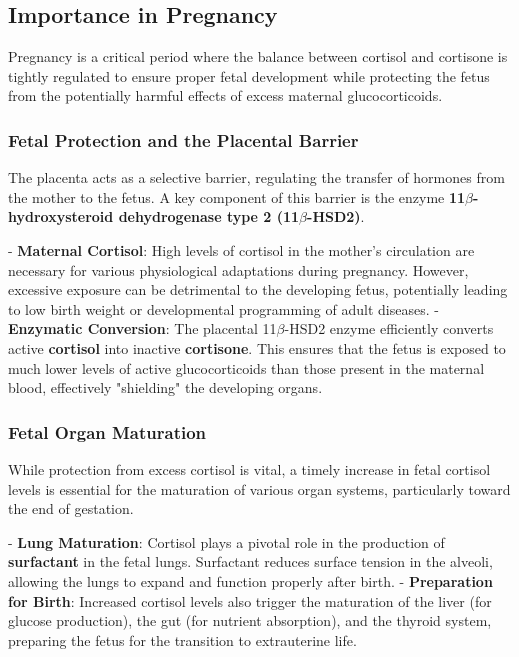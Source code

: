 \documentclass{article}
\begin{document}
\subsection{Importance in Pregnancy}

Pregnancy is a critical period where the balance between cortisol and cortisone is tightly regulated to ensure proper fetal development while protecting the fetus from the potentially harmful effects of excess maternal glucocorticoids.

\subsubsection{Fetal Protection and the Placental Barrier}

The placenta acts as a selective barrier, regulating the transfer of hormones from the mother to the fetus. A key component of this barrier is the enzyme \textbf{11\texorpdfstring{$\beta$}{beta}-hydroxysteroid dehydrogenase type 2 (11\texorpdfstring{$\beta$}{beta}-HSD2)}.

- \textbf{Maternal Cortisol}: High levels of cortisol in the mother's circulation are necessary for various physiological adaptations during pregnancy. However, excessive exposure can be detrimental to the developing fetus, potentially leading to low birth weight or developmental programming of adult diseases.
- \textbf{Enzymatic Conversion}: The placental 11\texorpdfstring{$\beta$}{beta}-HSD2 enzyme efficiently converts active \textbf{cortisol} into inactive \textbf{cortisone}. This ensures that the fetus is exposed to much lower levels of active glucocorticoids than those present in the maternal blood, effectively "shielding" the developing organs.

\subsubsection{Fetal Organ Maturation}

While protection from excess cortisol is vital, a timely increase in fetal cortisol levels is essential for the maturation of various organ systems, particularly toward the end of gestation.

- \textbf{Lung Maturation}: Cortisol plays a pivotal role in the production of \textbf{surfactant} in the fetal lungs. Surfactant reduces surface tension in the alveoli, allowing the lungs to expand and function properly after birth.
- \textbf{Preparation for Birth}: Increased cortisol levels also trigger the maturation of the liver (for glucose production), the gut (for nutrient absorption), and the thyroid system, preparing the fetus for the transition to extrauterine life.
\end{document}
